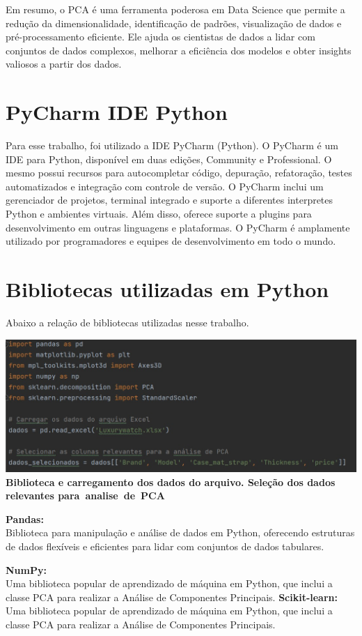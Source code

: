 \documentclass[12pt, a4paper]{article}
\begin{document}
\begin{enumerate}
    
Em resumo, o PCA é uma ferramenta poderosa em Data Science que permite a redução da dimensionalidade, identificação de padrões, visualização de dados e pré-processamento eficiente. Ele ajuda os cientistas de dados a lidar com conjuntos de dados complexos, melhorar a eficiência dos modelos e obter insights valiosos a partir dos dados.
\section{PyCharm IDE Python}

Para esse trabalho, foi utilizado a IDE PyCharm (Python).
O PyCharm é um IDE para Python, disponível em duas edições, Community e Professional. O mesmo possui recursos para autocompletar código, depuração, refatoração, testes automatizados e integração com controle de versão. O PyCharm inclui um gerenciador de projetos, terminal integrado e suporte a diferentes interpretes Python e ambientes virtuais. Além disso, oferece suporte a plugins para desenvolvimento em outras linguagens e plataformas. O PyCharm é amplamente utilizado por programadores e equipes de desenvolvimento em todo o mundo.

\section{Bibliotecas utilizadas em Python}
Abaixo a relação de bibliotecas utilizadas nesse trabalho.
\begin{center}
    \includegraphics[width=14cm]{figura1}
 \textbf{Biblioteca e carregamento dos dados do arquivo. 
Seleção dos dados relevantes para analise de PCA}   
\end{center}

\textbf{Pandas:}\\
Biblioteca para manipulação e análise de dados em Python, oferecendo estruturas de dados flexíveis e eficientes para lidar com conjuntos de dados tabulares.

\textbf{NumPy:}\\
Uma biblioteca popular de aprendizado de máquina em Python, que inclui a classe PCA para realizar a Análise de Componentes Principais.
\textbf{Scikit-learn:}\\
Uma biblioteca popular de aprendizado de máquina em Python, que inclui a classe PCA para realizar a Análise de Componentes Principais.


\end{enumerate}
\end{document}
